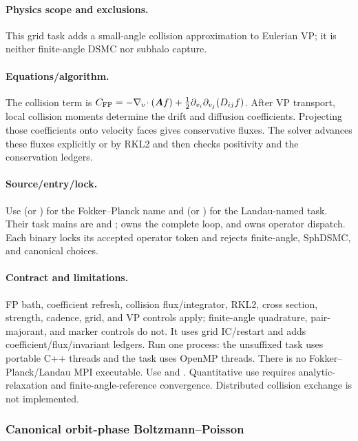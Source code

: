 \paragraph{Physics scope and exclusions.}
This grid task adds a small-angle collision approximation to Eulerian
VP; it is neither finite-angle DSMC nor subhalo capture.
\paragraph{Equations/algorithm.}
The collision term is
\(C_{\rm FP}=-\nabla_v\!\cdot(\bm A f)+\tfrac12\partial_{v_i}\partial_{v_j}
(D_{ij}f)\).  After VP transport, local collision moments determine the drift and
diffusion coefficients. Projecting those coefficients onto velocity faces
gives conservative fluxes. The solver advances these fluxes explicitly or by
RKL2 and then checks positivity and the conservation ledgers.
\paragraph{Source/entry/lock.}
Use  (or ) for
the Fokker--Planck name and  (or
) for the Landau-named task.  Their task mains are
 and
;
 owns the complete loop, and
 owns operator dispatch.  Each
binary locks its accepted operator token and rejects
finite-angle, SphDSMC, and canonical choices.
\paragraph{Contract and limitations.}
FP bath, coefficient refresh, collision flux/integrator, RKL2, cross section,
strength, cadence, grid, and VP controls apply; finite-angle quadrature,
pair-majorant, and marker controls do not.  It uses grid IC/restart and adds
coefficient/flux/invariant ledgers.  Run one process: the unsuffixed task uses
portable C++ threads and the  task uses OpenMP threads.  There is
no Fokker--Planck/Landau MPI executable.  Use
 and
.  Quantitative use requires
analytic-relaxation and finite-angle-reference convergence.  Distributed
collision exchange is not implemented.

\subsubsection{Canonical orbit-phase Boltzmann--Poisson}
